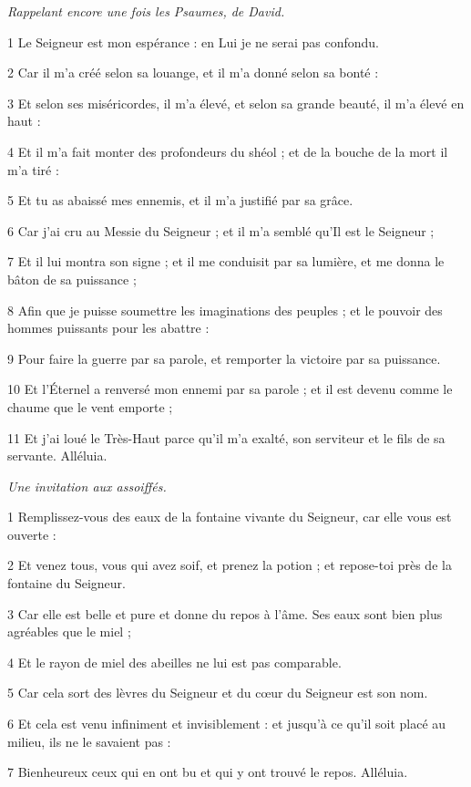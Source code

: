 
\par \textit{Rappelant encore une fois les Psaumes, de David.}

\par 1 Le Seigneur est mon espérance : en Lui je ne serai pas confondu.
\par 2 Car il m'a créé selon sa louange, et il m'a donné selon sa bonté :
\par 3 Et selon ses miséricordes, il m'a élevé, et selon sa grande beauté, il m'a élevé en haut :
\par 4 Et il m'a fait monter des profondeurs du shéol ; et de la bouche de la mort il m'a tiré :
\par 5 Et tu as abaissé mes ennemis, et il m'a justifié par sa grâce.
\par 6 Car j'ai cru au Messie du Seigneur ; et il m'a semblé qu'Il est le Seigneur ;
\par 7 Et il lui montra son signe ; et il me conduisit par sa lumière, et me donna le bâton de sa puissance ;
\par 8 Afin que je puisse soumettre les imaginations des peuples ; et le pouvoir des hommes puissants pour les abattre :
\par 9 Pour faire la guerre par sa parole, et remporter la victoire par sa puissance.
\par 10 Et l'Éternel a renversé mon ennemi par sa parole ; et il est devenu comme le chaume que le vent emporte ;
\par 11 Et j'ai loué le Très-Haut parce qu'il m'a exalté, son serviteur et le fils de sa servante. Alléluia.


\par \textit{Une invitation aux assoiffés.}

\par 1 Remplissez-vous des eaux de la fontaine vivante du Seigneur, car elle vous est ouverte :
\par 2 Et venez tous, vous qui avez soif, et prenez la potion ; et repose-toi près de la fontaine du Seigneur.
\par 3 Car elle est belle et pure et donne du repos à l'âme. Ses eaux sont bien plus agréables que le miel ;
\par 4 Et le rayon de miel des abeilles ne lui est pas comparable.
\par 5 Car cela sort des lèvres du Seigneur et du cœur du Seigneur est son nom.
\par 6 Et cela est venu infiniment et invisiblement : et jusqu'à ce qu'il soit placé au milieu, ils ne le savaient pas :
\par 7 Bienheureux ceux qui en ont bu et qui y ont trouvé le repos. Alléluia.

